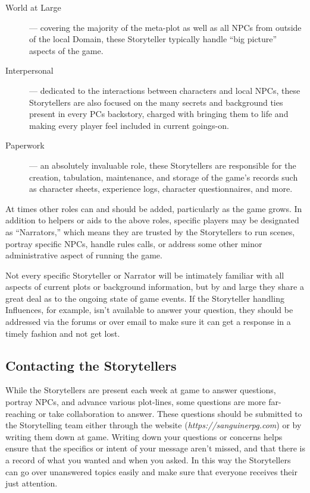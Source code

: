 \begin{description}
	\item[World at Large]--- covering the majority of the meta-plot as well as all NPCs 
	from outside of the local Domain, these Storyteller typically handle ``big picture'' 
	aspects of the game.
	\item[Interpersonal]--- dedicated to the interactions between characters and local 
	NPCs, these Storytellers are also focused on the many secrets and background ties present 
	in every PCs backstory, charged with bringing them to life and making every player 
	feel included in current goings-on.
	\item[Paperwork]--- an absolutely invaluable role, these Storytellers are responsible for 
	the creation, tabulation, maintenance, and storage of the game's records such as character 
	sheets, experience logs, character questionnaires, and more.
\end{description}

\noindent At times other roles can and should be added, particularly as the game grows.  In addition to 
helpers or aids to the above roles, specific players may be designated as ``Narrators,'' which 
means they are trusted by the Storytellers to run scenes, portray specific NPCs, handle rules 
calls, or address some other minor administrative aspect of running the game.

Not every specific Storyteller or Narrator will be intimately familiar with all aspects of 
current plots or background information, but by and large they share a great deal as to the 
ongoing state of game events.  If the Storyteller handling Influences, for example, isn't available 
to answer your question, they should be addressed via the forums or over email to make sure it 
can get a response in a timely fashion and not get lost.

\subsection{Contacting the Storytellers}
While the Storytellers are present each week at game to answer questions, portray NPCs, and 
advance various plot-lines, some questions are more far-reaching or take collaboration to 
answer.  These questions should be submitted to the Storytelling team either through the 
website (\emph{https://sanguinerpg.com}) or by writing them down at game.  Writing down your 
questions or concerns helps ensure that the specifics or intent of your message aren't missed, 
and that there is a record of what you wanted and when you asked.  In this way the Storytellers 
can go over unanswered topics easily and make sure that everyone receives their just attention.

